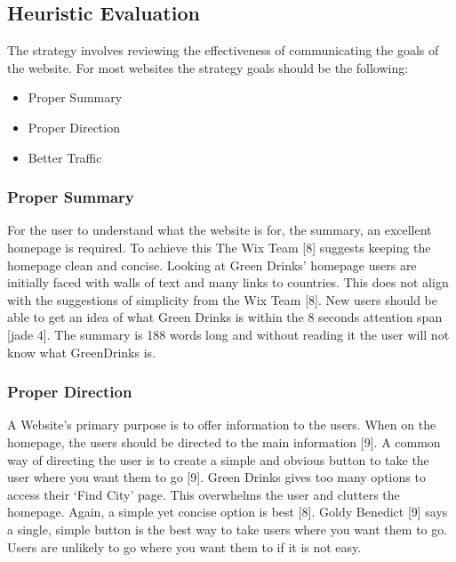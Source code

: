 \documentclass[12pt]{article}
\begin{document}
\subsection{Heuristic Evaluation}
The strategy involves reviewing the effectiveness of communicating the goals of the website. For most websites the strategy goals should be the following:
\begin{itemize}
\item Proper Summary
\item Proper Direction
\item Better Traffic
\end{itemize}



\subsubsection*{Proper Summary }  
For the user to understand what the website is for, the summary, an excellent homepage is required. To achieve this The Wix Team [8] suggests keeping the homepage clean and concise.
Looking at Green Drinks’ homepage users are initially faced with walls of text and many links to countries. This does not align with the suggestions of simplicity from the Wix Team [8].  New users should be able to get an idea of what Green Drinks is within the 8 seconds attention span [jade 4]. The summary is 188 words long and without reading it the user will not know what GreenDrinks is. 

\subsubsection*{Proper Direction}
A Website’s primary purpose is to offer information to the users. When on the homepage, the users should be directed to the main information [9]. A common way of directing the user is to create a simple and obvious button to take the user where you want them to go [9]. 
Green Drinks gives too many options to access their ‘Find City’ page. This overwhelms the user and clutters the homepage. Again, a simple yet concise option is best [8]. Goldy Benedict [9] says a single, simple button is the best way to take users where you want them to go. Users are unlikely to go where you want them to if it is not easy.
\end{document}
